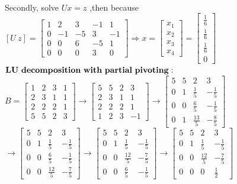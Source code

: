 \documentclass[english,onecolumn]{IEEEtran}
\begin{document}
\begin{enumerate}
\\Secondly, solve $U x=z$ ,then because $\left[U\  z\right]=\left[\begin{array}{rrrr|r}1 & 2 & 3 & -1 & 1 \\ 0 & -1 & -5 & 3 & -1 \\ 0 & 0 & 6 & -5 & 1 \\ 0 & 0 & 0 & 3 & 0\end{array}\right] \Rightarrow x=\left[\begin{array}{l}x_{1} \\ x_{2} \\ x_{3} \\ x_{4}\end{array}\right]= \left[ \begin{array}{l} \frac{1}{6} \\ \frac{1}{6} \\ \frac{1}{6} \\ 0\end{array}\right]$
\\$\bold{ LU\  decomposition\  with\  partial\  pivoting:}$ 
\\$B=\left[\begin{array}{llll}1 & 2 & 3 & 1 \\ 2 & 3 & 1 & 1 \\ 2 & 2 & 2 & 1 \\ 5 & 5 & 2 & 3\end{array}\right] \rightarrow\left[\begin{array}{llll}5 & 5 & 2 & 3 \\ 2 & 3 & 1 & 1 \\ 2 & 2 & 2 & 1 \\ 1 & 2 & 3 & -1\end{array}\right] \rightarrow\left[\begin{array}{llll}5 & 5 & 2 & 3 \\ 0 & 1 & \frac{1}{5} & -\frac{1}{5} \\ 0 & 0 & \frac{6}{5} & -\frac{1}{5} \\ 0 & 1 & \frac{13}{5} & -\frac{8}{5}\end{array}\right]$$\rightarrow\left[\begin{array}{cccc}5 & 5 & 2 & 3 \\ 0 & 1 & \frac{1}{5} & -\frac{1}{5} \\ 0 & 0 & \frac{6}{5} & -\frac{1}{5} \\ 0 & 0 & \frac{12}{5} & -\frac{7}{5}\end{array}\right] \rightarrow\left[\begin{array}{cccc}5 & 5 & 2 & 3 \\ 0 & 1 & \frac{1}{5} & -\frac{1}{5} \\ 0 & 0 & \frac{12}{5} & -\frac{7}{5} \\ 0 & 0 & \frac{6}{5} & -\frac{1}{5}\end{array}\right] \rightarrow\left[\begin{array}{cccc}5 & 5 & 2 & 3 \\ 0 & 1 & \frac{1}{5} & -\frac{1}{5} \\ 0 & 0 & \frac{12}{5} & -\frac{7}{5} \\ 0 & 0 & 0 & \frac{1}{2}\end{array}\right]$
$$
\end{enumerate}
\end{document}
